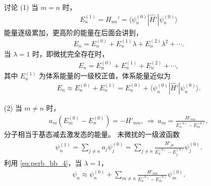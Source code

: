 讨论 (1) 当 $m=n$ 时，
\begin{align}
    E_n^{(1)} = H_{nn}' = \langle \psi_n^{(0)} | \hat H' | \psi_n^{(0)} \rangle
\end{align}
能量逐级累加，更高阶的能量在后面会讲到，
\begin{align}
    E_n = E_n^{(0)} + E_n^{(1)} \lambda + E_n^{(2)}\lambda ^2 + \cdots.
\end{align}
当 $\lambda = 1$ 时，即微扰完全存在时，
\begin{align}
    E_n = E_n^{(0)} + E_n^{(1)} + E_n^{(2)} + \cdots, 
\end{align}
其中 $E_n^{(1)}$ 为体系能量的一级校正值，体系能量近似为
\begin{align}
    E_n \approx E_n^{(0)} + E_n^{(1)} = E_n^{(0)} + \langle \psi_n^{(0)} | \hat H ' | \psi_n^{(0)} \rangle. 
\end{align}

(2) 当 $m \neq n$ 时，
\begin{align}
    a_m (E_m^{(0)} - E_n^{(0)}) = - H'_{mn},\ \Rightarrow \ a_m = \frac{H'_{mn}}{E_n^{(0)} - E_m^{(0)}}, 
\end{align}
分子相当于基态减去激发态的能量。
未微扰的一级波函数
\begin{align}
    \psi_n^{(1)} = \sum_{j\neq n} a_j \psi_j^{(0)} = \sum_{j\neq n} \frac{H'_{jn}}{E_n^{(0)} - E_j^{(0)}}\psi_j^{(0)}. 
\end{align}
利用 \eqref{eq:perb_bb_4}，当 $\lambda = 1$，
\begin{align}
    \psi_n \approx \psi_n^{(0)} + \sum_{m\neq n} \frac{H'_{mn}}{E_n^{(0)} - E_m^{(0)}}\psi_m^{(0)}. 
\end{align}

